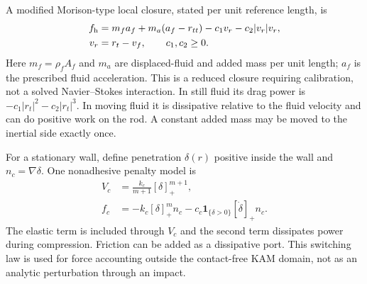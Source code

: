 A modified Morison-type local closure, stated per unit reference length,
is
\begin{align}
 f_{\rm h}={}&m_f a_f+m_a(a_f-r_{tt})
             -c_1v_r-c_2|v_r|v_r,\\
 v_r={}&r_t-v_f,\qquad c_1,c_2\ge0.
\end{align}
Here $m_f=\rho_f A_f$ and $m_a$ are displaced-fluid and added mass
per unit length; $a_f$ is the prescribed fluid acceleration.
This is a reduced closure requiring calibration, not a solved
Navier--Stokes interaction. In still fluid its drag power is
$-c_1|r_t|^2-c_2|r_t|^3$. In moving fluid it is dissipative relative to
the fluid velocity and can do positive work on the rod. A constant
added mass may be moved to the inertial side exactly once.

For a stationary wall, define penetration $\delta(r)$ positive inside
the wall and $n_c=\nabla\delta$. One nonadhesive penalty model is
\begin{align}
 V_c&=\frac{k_c}{m+1}[\delta]_+^{m+1},\\
 f_c&=-k_c[\delta]_+^m n_c
       -c_c\mathbf1_{\{\delta>0\}}[\dot\delta]_+n_c.
\end{align}
The elastic term is included through $V_c$ and the second term dissipates
power during compression. Friction can be added as a dissipative port.
This switching law is used for force accounting outside the contact-free
KAM domain, not as an analytic perturbation through an impact.

